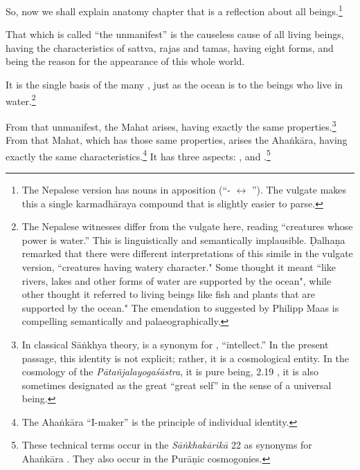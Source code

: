 \begin{translation}
    
    \item [1] 
    
    So, now we shall explain anatomy chapter that is a reflection about all 
    beings.\footnote{The Nepalese version has nouns in apposition 
    (“- $\leftrightarrow$ ”).  The vulgate makes this a 
    single 
    karmadhāraya compound that is slightly easier to parse.} 
    
\item[3]


That which is called “the unmanifest” is the causeless cause of all living beings,  
having the characteristics of sattva, rajas and tamas, having eight forms, and 
being the reason for the appearance of this whole world.
    
It is the single basis of the many , just as the ocean is to the beings who live in
water.\footnote{The Nepalese witnesses differ from the vulgate here,
    reading  “creatures whose power is water.”  This is
    linguistically and semantically implausible. Ḍalhaṇa remarked that
    there were different interpretations of this simile in the vulgate
    version,  “creatures having watery character." Some
    thought it meant ``like rivers, lakes and other forms of water are
    supported by the ocean", while other thought it referred to living
    beings like fish and plants that are supported by the ocean." The
    emendation to  suggested by Philipp Maas is compelling
    semantically and palaeographically.}
    
\item[3.1.4]

From that unmanifest, the Mahat arises, having exactly the same
properties.\footnote{In classical Sāṅkhya theory,  is a
    synonym for , ``intellect.''  In the present passage, this
    identity is not explicit; rather, it is a cosmological entity.  In the
    cosmology of the \emph{Pātañjalayogaśāstra}, it is pure being, 
     2.19 \citep[85]{agas-1904}, it is
    also sometimes designated as the great  ``great self'' in
    the sense of a universal being.} %
    From that Mahat, which has those same properties, arises the
    Ahaṅkāra, having exactly the same characteristics.\footnote{The
        Ahaṅkāra ``I-maker'' is the principle of individual identity.}  It
        has three aspects: , 
        and .\footnote{These technical terms occur
            in the \emph{Sāṅkhakārikā} 22 as synonyms for Ahaṅkāra
            \parencites[46--47]{sast-1948}[187--188]{wezl-1998}. They also
            occur in the Purāṇic cosmogonies.}
            

\end{translation}
